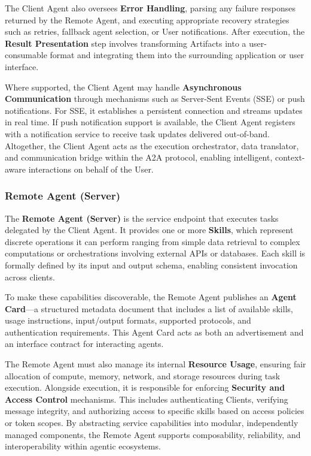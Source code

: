 \documentclass{article}
\begin{document}
The Client Agent also oversees \textbf{Error Handling}, parsing any failure responses returned by the Remote Agent, and executing appropriate recovery strategies such as retries, fallback agent selection, or User notifications. After execution, the \textbf{Result Presentation} step involves transforming Artifacts into a user-consumable format and integrating them into the surrounding application or user interface.

Where supported, the Client Agent may handle \textbf{Asynchronous Communication} through mechanisms such as Server-Sent Events (SSE) or push notifications. For SSE, it establishes a persistent connection and streams updates in real time. If push notification support is available, the Client Agent registers with a notification service to receive task updates delivered out-of-band. Altogether, the Client Agent acts as the execution orchestrator, data translator, and communication bridge within the A2A protocol, enabling intelligent, context-aware interactions on behalf of the User.

\subsubsection{Remote Agent (Server)}
The \textbf{Remote Agent (Server)} is the service endpoint that executes tasks delegated by the Client Agent. It provides one or more \textbf{Skills}, which represent discrete operations it can perform ranging from simple data retrieval to complex computations or orchestrations involving external APIs or databases. Each skill is formally defined by its input and output schema, enabling consistent invocation across clients.

To make these capabilities discoverable, the Remote Agent publishes an \textbf{Agent Card}—a structured metadata document that includes a list of available skills, usage instructions, input/output formats, supported protocols, and authentication requirements. This Agent Card acts as both an advertisement and an interface contract for interacting agents.

The Remote Agent must also manage its internal \textbf{Resource Usage}, ensuring fair allocation of compute, memory, network, and storage resources during task execution. Alongside execution, it is responsible for enforcing \textbf{Security and Access Control} mechanisms. This includes authenticating Clients, verifying message integrity, and authorizing access to specific skills based on access policies or token scopes. By abstracting service capabilities into modular, independently managed components, the Remote Agent supports composability, reliability, and interoperability within agentic ecosystems.
\end{document}
